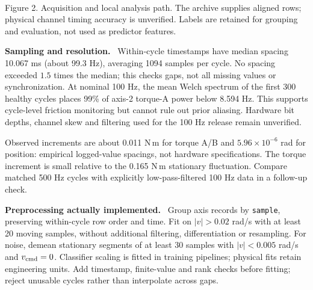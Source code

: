 \documentclass[10pt,letterpaper]{article}
\newcommand{\heading}[1]{\vspace{5pt}{\large\bfseries #1}\par\vspace{1pt}}
\newcommand{\subhead}[1]{\textbf{#1}\ }
\newcommand{\code}[1]{\texttt{\small #1}}
\begin{document}
\newpage
\heading{2.2 Sensing Sampling and Data Acquisition Continued}
\begin{center}
\\[2pt]
{\footnotesize Figure 2. Acquisition and local analysis path. The archive supplies aligned rows; physical channel timing accuracy is unverified. Labels are retained for grouping and evaluation, not used as predictor features.}
\end{center}

\subhead{Sampling and resolution.}
Within-cycle timestamps have median spacing 10.067 ms (about 99.3 Hz), averaging 1094 samples per cycle. No spacing exceeded $1.5$ times the median; this checks gaps, not all missing values or synchronization. At nominal 100 Hz, the mean Welch spectrum of the first 300 healthy cycles places 99\% of axis-2 torque-A power below 8.594 Hz. This supports cycle-level friction monitoring but cannot rule out prior aliasing. Hardware bit depths, channel skew and filtering used for the 100 Hz release remain unverified.

Observed increments are about 0.011 N\,m for torque A/B and $5.96\times10^{-6}$ rad for position: empirical logged-value spacings, not hardware specifications. The torque increment is small relative to the 0.165 N\,m stationary fluctuation. Compare matched 500 Hz cycles with explicitly low-pass-filtered 100 Hz data in a follow-up check.

\subhead{Preprocessing actually implemented.}
Group axis records by \code{sample}, preserving within-cycle row order and time. Fit on $|v|>0.02$ rad/s with at least 20 moving samples, without additional filtering, differentiation or resampling. For noise, demean stationary segments of at least 30 samples with $|v|<0.005$ rad/s and $v_{\rm cmd}=0$. Classifier scaling is fitted in training pipelines; physical fits retain engineering units. Add timestamp, finite-value and rank checks before fitting; reject unusable cycles rather than interpolate across gaps.
\end{document}
